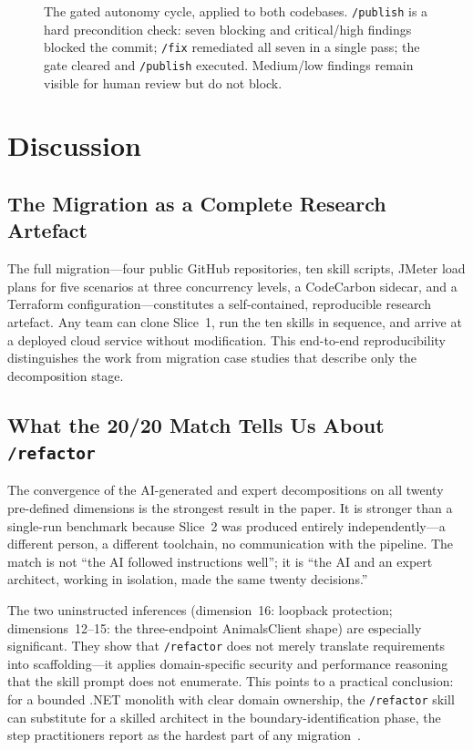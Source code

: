 \documentclass[10pt,journal,compsoc]{IEEEtran}
\begin{document}
\begin{figure}[!t]
  \centering
  
  \caption{The gated autonomy cycle, applied to both codebases.
    \texttt{/publish} is a hard precondition check: seven blocking and
    critical/high findings blocked the commit; \texttt{/fix}
    remediated all seven in a single pass; the gate cleared and
    \texttt{/publish} executed.  Medium/low findings remain visible
    for human review but do not block.}
  \label{fig:gate}
\end{figure}

\section{Discussion}
\label{sec:discussion}

\subsection{The Migration as a Complete Research Artefact}
The full migration—four public GitHub repositories, ten skill scripts,
JMeter load plans for five scenarios at three concurrency levels, a
CodeCarbon sidecar, and a Terraform configuration—constitutes a
self-contained, reproducible research artefact.  Any team can
clone Slice~1, run the ten skills in sequence, and arrive at a
deployed cloud service without modification.  This
end-to-end reproducibility distinguishes the work from migration case
studies that describe only the decomposition stage.

\subsection{What the 20/20 Match Tells Us About \texttt{/refactor}}
The convergence of the AI-generated and expert decompositions on all
twenty pre-defined dimensions is the strongest result in the paper.
It is stronger than a single-run benchmark because Slice~2 was
produced entirely independently—a different person, a different
toolchain, no communication with the pipeline.  The match is not
``the AI followed instructions well''; it is ``the AI and an expert
architect, working in isolation, made the same twenty decisions.''

The two uninstructed inferences (dimension~16: loopback protection;
dimensions~12--15: the three-endpoint AnimalsClient shape) are
especially significant.  They show that \texttt{/refactor} does not
merely translate requirements into scaffolding—it applies
domain-specific security and performance reasoning that the skill
prompt does not enumerate.  This points to a practical conclusion:
for a bounded .NET monolith with clear domain ownership, the
\texttt{/refactor} skill can substitute for a skilled architect in
the boundary-identification phase, the step practitioners report as
the hardest part of any migration~\cite{taibi2017processes}.
\end{document}
